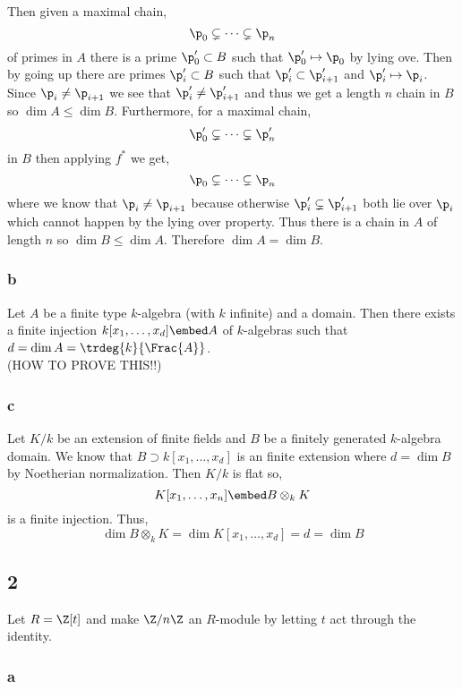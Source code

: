 \documentclass[12pt]{article}
\begin{document}
Then given a maximal chain,
\[ \p_0 \subsetneq \cdots \subsetneq \p_n \]
of primes in $A$ there is a prime $\p_0' \subset B$ such that $\p_0' \mapsto \p_0$ by lying ove. Then by going up there are primes $\p_i' \subset B$ such that $\p_i' \subset \p_{i+1}'$ and $\p_i' \mapsto \p_i$. Since $\p_i \neq \p_{i+1}$ we see that $\p_i' \neq \p_{i+1}'$ and thus we get a length $n$ chain in $B$ so $\dim{A} \le \dim{B}$. Furthermore, for a maximal chain,
\[ \p_0' \subsetneq \cdots \subsetneq \p_n' \]
in $B$ then applying $f^*$ we get,
\[ \p_0 \subsetneq \cdots \subsetneq \p_n \]
where we know that $\p_i \neq \p_{i+1}$ because otherwise $\p_i' \subsetneq \p_{i+1}'$ both lie over $\p_i$ which cannot happen by the lying over property. Thus there is a chain in $A$ of length $n$ so $\dim{B} \le \dim{A}$. Therefore $\dim{A} = \dim{B}$.

\subsubsection{b}

Let $A$ be a finite type $k$-algebra (with $k$ infinite) and a domain. Then there exists a finite injection $k[x_1, \dots, x_d] \embed A$ of $k$-algebras such that $d = \dim{A} = \trdeg{k}{\Frac{A}}$.
\bigskip\\
(HOW TO PROVE THIS!!)

\subsubsection{c}

Let $K / k$ be an extension of finite fields and $B$ be a finitely generated $k$-algebra domain. We know that $B \supset k[x_1, \dots, x_d]$ is an finite extension where $d = \dim{B}$ by Noetherian normalization. Then $K / k$ is flat so,
\[ K[x_1, \dots, x_n] \embed B \otimes_k K \]
is a finite injection. Thus, 
\[ \dim{B \otimes_k K} = \dim{K[x_1, \dots, x_d]} = d = \dim{B} \]


\subsection{2}

Let $R = \Z[t]$ and make $\Z / n \Z$ an $R$-module by letting $t$ act through the identity. 

\subsubsection{a}
\end{document}
